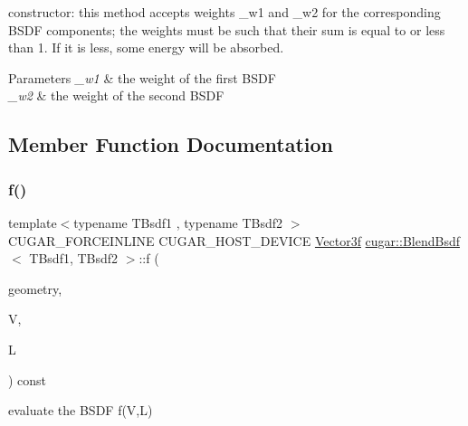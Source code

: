 constructor\+: this method accepts weights \+\_\+w1 and \+\_\+w2 for the corresponding B\+S\+DF components; the weights must be such that their sum is equal to or less than 1. If it is less, some energy will be absorbed.


\begin{DoxyParams}{Parameters}
{\em \+\_\+w1} & the weight of the first B\+S\+DF \\
\hline
{\em \+\_\+w2} & the weight of the second B\+S\+DF \\
\hline
\end{DoxyParams}


\subsection{Member Function Documentation}
\mbox{\label{structcugar_1_1_blend_bsdf_a5837aacab01105f3023c7653b82a5e65}} 
\subsubsection{\texorpdfstring{f()}{f()}}
{\footnotesize\ttfamily template$<$typename T\+Bsdf1 , typename T\+Bsdf2 $>$ \\
C\+U\+G\+A\+R\+\_\+\+F\+O\+R\+C\+E\+I\+N\+L\+I\+NE C\+U\+G\+A\+R\+\_\+\+H\+O\+S\+T\+\_\+\+D\+E\+V\+I\+CE \hyperlink{structcugar_1_1_vector}{Vector3f} \hyperlink{structcugar_1_1_blend_bsdf}{cugar\+::\+Blend\+Bsdf}$<$ T\+Bsdf1, T\+Bsdf2 $>$\+::f (\begin{DoxyParamCaption}\item[{const \hyperlink{structcugar_1_1_differential_geometry}{Differential\+Geometry} \&}]{geometry,  }\item[{const \hyperlink{structcugar_1_1_vector}{Vector3f}}]{V,  }\item[{const \hyperlink{structcugar_1_1_vector}{Vector3f}}]{L }\end{DoxyParamCaption}) const\hspace{0.3cm}{\ttfamily [inline]}}

evaluate the B\+S\+DF f(\+V,\+L) \mbox{\label{structcugar_1_1_blend_bsdf_ac8354f275a1834a351d8347d922e6415}} 
